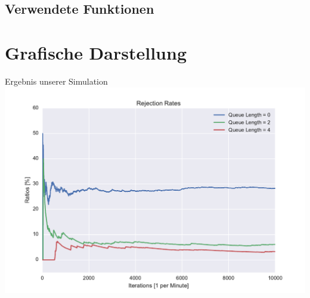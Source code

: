 \subsection{Verwendete Funktionen}
%

\section{Grafische Darstellung}
\begin{frame}{Ergebnis unserer Simulation}
	\centering
  	\includegraphics[scale=0.6]{BSP24_Plot.pdf}
\end{frame}


